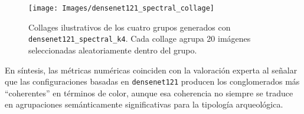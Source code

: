 \begin{figure}[!h]
  \centering
  \texttt{[image: Images/densenet121\_spectral\_collage]}
  \caption{Collages ilustrativos de los cuatro grupos generados con \texttt{densenet121\_spectral\_k4}.
  Cada collage agrupa 20 imágenes seleccionadas aleatoriamente dentro del grupo.}
  \label{fig:cluster_collages}
\end{figure}

En síntesis, las métricas numéricas coinciden con la valoración experta al señalar que las configuraciones basadas en \texttt{densenet121} producen los conglomerados más “coherentes” en términos de color, aunque esa coherencia no siempre se traduce en agrupaciones semánticamente significativas para la tipología arqueológica.
